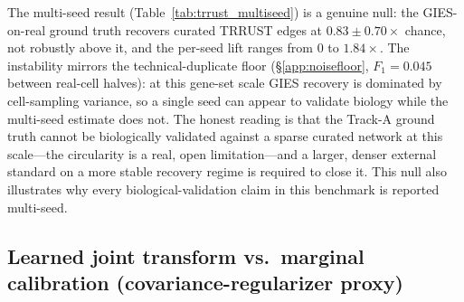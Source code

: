 \documentclass{article}
\theoremstyle{plain}
\theoremstyle{definition}
\theoremstyle{remark}
\begin{document}
The multi-seed result (Table~\ref{tab:trrust_multiseed}) is a genuine null: the GIES-on-real ground truth recovers curated TRRUST edges at $0.83 \pm 0.70\times$ chance, not robustly above it, and the per-seed lift ranges from $0$ to $1.84\times$. The instability mirrors the technical-duplicate floor (\S\ref{app:noisefloor}, $F_1 = 0.045$ between real-cell halves): at this gene-set scale GIES recovery is dominated by cell-sampling variance, so a single seed can appear to validate biology while the multi-seed estimate does not. The honest reading is that the Track-A ground truth cannot be biologically validated against a sparse curated network at this scale---the circularity is a real, open limitation---and a larger, denser external standard on a more stable recovery regime is required to close it. This null also illustrates why every biological-validation claim in this benchmark is reported multi-seed.

\subsection{Learned joint transform vs.\ marginal calibration (covariance-regularizer proxy)}
\label{app:j2}
\end{document}
